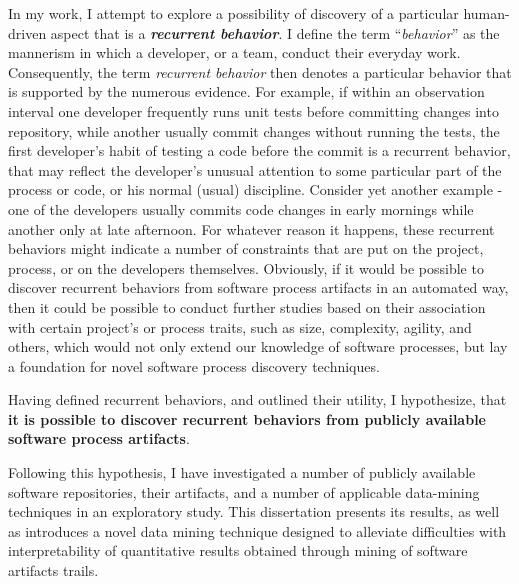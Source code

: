 In my work, I attempt to explore a possibility of discovery of a particular human-driven aspect that is a 
\textit{\textbf{recurrent behavior}}. 
I define the term ``\textit{behavior}'' as the mannerism in which a developer, or a team, conduct 
their everyday work. Consequently, the term \textit{recurrent behavior} then denotes a particular 
behavior that is supported by the numerous evidence. 
For example, if within an observation interval one developer frequently runs unit tests before committing 
changes into repository, while another usually commit changes without running the tests, the first developer's
habit of testing a code before the commit is a recurrent behavior, that may reflect the developer's unusual 
attention to some particular part of the process or code, or his normal (usual) discipline. 
Consider yet another example - one of the developers usually commits code changes in early mornings while 
another only at late afternoon. For whatever reason it happens, these recurrent behaviors might indicate 
a number of constraints that are put on the project, process, or on the developers themselves.
Obviously, if it would be possible to discover recurrent behaviors from software process artifacts in an
automated way, then it could be possible to conduct further studies based on their association with 
certain project's or process traits, such as size, complexity, agility, and others, which would not only 
extend our knowledge of software processes, but lay a foundation for novel software process discovery techniques.

Having defined recurrent behaviors, and outlined their utility, I hypothesize, 
that \textbf{it is possible to discover recurrent behaviors from publicly available software process artifacts}. 

Following this hypothesis, I have investigated a number of publicly available software repositories,
their artifacts, and a number of applicable data-mining techniques in an exploratory study.
This dissertation presents its results, as well as introduces a novel data mining technique designed to 
alleviate difficulties with interpretability of quantitative results obtained through mining of software
artifacts trails. 

%
%
